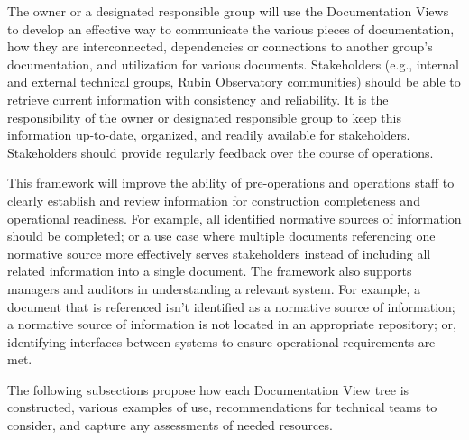 The owner or a designated responsible group will use the Documentation Views to develop an effective way to communicate the various pieces of documentation, how they are interconnected, dependencies or connections to another group's documentation, and utilization for various documents.
Stakeholders (e.g., internal and external technical groups, Rubin Observatory communities) should be able to retrieve current information with consistency and reliability.
It is the responsibility of the owner or designated responsible group to keep this information up-to-date, organized, and readily available for stakeholders.
Stakeholders should provide regularly feedback over the course of operations.

This framework will improve the ability of pre-operations and operations staff to clearly establish and review information for construction completeness and operational readiness.
For example, all identified normative sources of information should be completed; or a use case where multiple documents referencing one normative source more effectively serves stakeholders instead of including all related information into a single document.
The framework also supports managers and auditors in understanding a relevant system.
For example, a document that is referenced isn't identified as a normative source of information; a normative source of information is not located in an appropriate repository; or, identifying interfaces between systems to ensure operational requirements are met.

The following subsections propose how each Documentation View tree is constructed, various examples of use, recommendations for technical teams to consider, and capture any assessments of needed resources.






